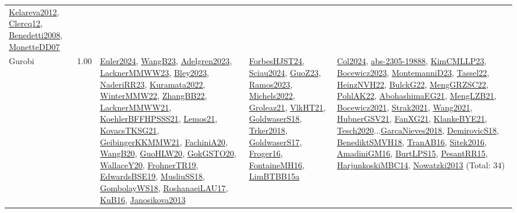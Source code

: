 {\begin{longtable}{p{3cm}r>{\raggedright\arraybackslash}p{6cm}>{\raggedright\arraybackslash}p{6cm}>{\raggedright\arraybackslash}p{8cm}}
\hyperref[detail:Kelareva2012]{Kelareva2012}, \hyperref[detail:Clercq12]{Clercq12}, \hyperref[detail:Benedetti2008]{Benedetti2008}, \hyperref[detail:MonetteDD07]{MonetteDD07}\\
\index{Gurobi}\index{CPSystems!Gurobi}Gurobi &  1.00 & \hyperref[detail:Euler2024]{Euler2024}, \hyperref[detail:WangB23]{WangB23}, \hyperref[detail:Adelgren2023]{Adelgren2023}, \hyperref[detail:LacknerMMWW23]{LacknerMMWW23}, \hyperref[detail:Bley2023]{Bley2023}, \hyperref[detail:NaderiRR23]{NaderiRR23}, \hyperref[detail:Kuramata2022]{Kuramata2022}, \hyperref[detail:WinterMMW22]{WinterMMW22}, \hyperref[detail:ZhangBB22]{ZhangBB22}, \hyperref[detail:LacknerMMWW21]{LacknerMMWW21}, \hyperref[detail:KoehlerBFFHPSSS21]{KoehlerBFFHPSSS21}, \hyperref[detail:Lemos21]{Lemos21}, \hyperref[detail:KovacsTKSG21]{KovacsTKSG21}, \hyperref[detail:GeibingerKKMMW21]{GeibingerKKMMW21}, \hyperref[detail:FachiniA20]{FachiniA20}, \hyperref[detail:WangB20]{WangB20}, \hyperref[detail:GuoHLW20]{GuoHLW20}, \hyperref[detail:GokGSTO20]{GokGSTO20}, \hyperref[detail:WallaceY20]{WallaceY20}, \hyperref[detail:FrohnerTR19]{FrohnerTR19}, \hyperref[detail:EdwardsBSE19]{EdwardsBSE19}, \hyperref[detail:MusliuSS18]{MusliuSS18}, \hyperref[detail:GombolayWS18]{GombolayWS18}, \hyperref[detail:RoshanaeiLAU17]{RoshanaeiLAU17}, \hyperref[detail:KuB16]{KuB16}, \hyperref[detail:Janosikova2013]{Janosikova2013} & \hyperref[detail:ForbesHJST24]{ForbesHJST24}, \hyperref[detail:Sciau2024]{Sciau2024}, \hyperref[detail:GuoZ23]{GuoZ23}, \hyperref[detail:Ramos2023]{Ramos2023}, \hyperref[detail:Michels2022]{Michels2022}, \hyperref[detail:Groleaz21]{Groleaz21}, \hyperref[detail:VlkHT21]{VlkHT21}, \hyperref[detail:GoldwaserS18]{GoldwaserS18}, \hyperref[detail:Trker2018]{Trker2018}, \hyperref[detail:GoldwaserS17]{GoldwaserS17}, \hyperref[detail:Froger16]{Froger16}, \hyperref[detail:FontaineMH16]{FontaineMH16}, \hyperref[detail:LimBTBB15a]{LimBTBB15a} & \hyperref[detail:Col2024]{Col2024}, \hyperref[detail:abs-2305-19888]{abs-2305-19888}, \hyperref[detail:KimCMLLP23]{KimCMLLP23}, \hyperref[detail:Bocewicz2023]{Bocewicz2023}, \hyperref[detail:MontemanniD23]{MontemanniD23}, \hyperref[detail:Tassel22]{Tassel22}, \hyperref[detail:HeinzNVH22]{HeinzNVH22}, \hyperref[detail:BulckG22]{BulckG22}, \hyperref[detail:MengGRZSC22]{MengGRZSC22}, \hyperref[detail:PohlAK22]{PohlAK22}, \hyperref[detail:AbohashimaEG21]{AbohashimaEG21}, \hyperref[detail:MengLZB21]{MengLZB21}, \hyperref[detail:Bocewicz2021]{Bocewicz2021}, \hyperref[detail:Strak2021]{Strak2021}, \hyperref[detail:Wang2021]{Wang2021}, \hyperref[detail:HubnerGSV21]{HubnerGSV21}, \hyperref[detail:FanXG21]{FanXG21}, \hyperref[detail:KlankeBYE21]{KlankeBYE21}, \hyperref[detail:Tesch2020]{Tesch2020}...\hyperref[detail:GarcaNieves2018]{GarcaNieves2018}, \hyperref[detail:DemirovicS18]{DemirovicS18}, \hyperref[detail:BenediktSMVH18]{BenediktSMVH18}, \hyperref[detail:TranAB16]{TranAB16}, \hyperref[detail:Sitek2016]{Sitek2016}, \hyperref[detail:AmadiniGM16]{AmadiniGM16}, \hyperref[detail:BurtLPS15]{BurtLPS15}, \hyperref[detail:PesantRR15]{PesantRR15}, \hyperref[detail:HarjunkoskiMBC14]{HarjunkoskiMBC14}, \hyperref[detail:Nowatzki2013]{Nowatzki2013} (Total: 34)\\

\end{longtable}}
